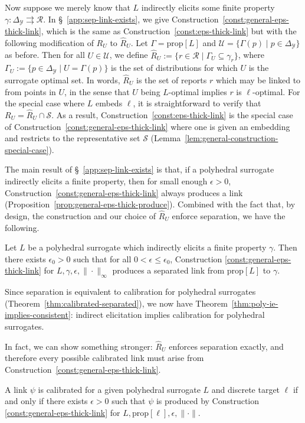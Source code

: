 \documentclass[twoside,11pt]{article}
\newcommand{\prop}[1]{\mathrm{prop}[#1]}
\newcommand{\simplex}{\Delta_\Y}
\newcommand{\R}{\mathcal{R}}
\newcommand{\Sc}{\mathcal{S}}
\newcommand{\U}{\mathcal{U}}
\newcommand{\Y}{\mathcal{Y}}
\newcommand{\toto}{\rightrightarrows}
\begin{document}
Now suppose we merely know that $L$ indirectly elicits some finite property $\gamma:\simplex\toto\R$.
In \S~\ref{app:sep-link-exists}, we give Construction~\ref{const:general-eps-thick-link}, which is the same as Construction~\ref{const:eps-thick-link} but with the following modification of $R_U$ to $\hat R_U$.
Let $\Gamma = \prop L$ and $\U = \{\Gamma(p) \mid p \in \simplex\}$ as before.
Then for all $U\in\U$, we define $\hat R_U := \{r\in\R \mid \Gamma_U \subseteq \gamma_r\}$, where $\Gamma_U := \{p\in\simplex \mid U = \Gamma(p)\}$ is the set of distributions for which $U$ is the surrogate optimal set.
In words, $\hat R_U$ is the set of reports $r$ which may be linked to from points in $U$, in the sense that $U$ being $L$-optimal implies $r$ is $\ell$-optimal.
For the special case where $L$ embeds $\ell$, it is straightforward to verify that $R_U = \hat R_U \cap \Sc$.
As a result, Construction~\ref{const:eps-thick-link} is the special case of Construction~\ref{const:general-eps-thick-link} where one is given an embedding and restricts to the representative set $\Sc$ (Lemma~\ref{lem:general-construction-special-case}).

The main result of \S~\ref{app:sep-link-exists} is that, if a polyhedral surrogate indirectly elicits a finite property, then for small enough $\epsilon>0$, Construction~\ref{const:general-eps-thick-link} always produces a link (Proposition~\ref{prop:general-eps-thick-produce}).
Combined with the fact that, by design, the construction and our choice of $\hat R_U$ enforce separation, we have the following.
\begin{proposition}\label{prop:general-eps-thick-separated}
  Let $L$ be a polyhedral surrogate which indirectly elicits a finite property $\gamma$.
  Then there exists $\epsilon_0>0$ such that for all $0 < \epsilon \leq \epsilon_0$, Construction \ref{const:general-eps-thick-link} for $L,\gamma,\epsilon,\|\cdot\|_{\infty}$ produces a separated link from $\prop{L}$ to $\gamma$.
\end{proposition}
\noindent
Since separation is equivalent to calibration for polyhedral surrogates (Theorem~\ref{thm:calibrated-separated}), we now have Theorem~\ref{thm:poly-ie-implies-consistent}: indirect elicitation implies calibration for polyhedral surrogates.


In fact, we can show something stronger: $\hat R_U$ enforces separation exactly, and therefore every possible calibrated link must arise from Construction~\ref{const:general-eps-thick-link}.

\begin{theorem}\label{thm:link-char}
  A link $\psi$ is calibrated for a given polyhedral surrogate $L$ and discrete target $\ell$ if and only if there exists $\epsilon>0$ such that $\psi$ is produced by Construction \ref{const:general-eps-thick-link} for $L,\prop\ell,\epsilon,\|\cdot\|$.
\end{theorem}
\end{document}
